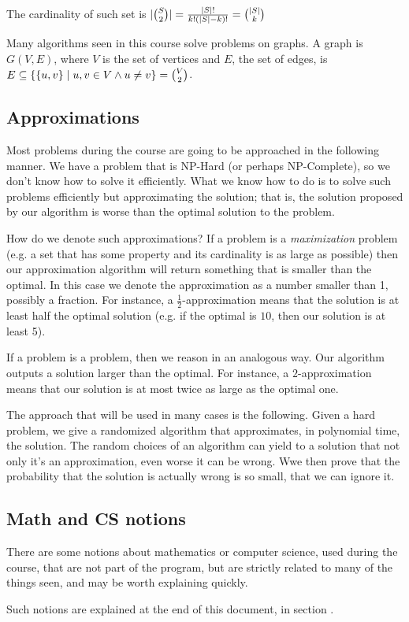     The cardinality of such set is $\vert \binom{S}{2} \vert = \frac{\vert S \vert!}{k! (\vert S \vert - k)!} = \binom{\vert S \vert}{k}$


    Many algorithms seen in this course solve problems on graphs.
    A graph is $G(V,E)$, where $V$ is the set of vertices and $E$, the set of edges, is $E \subseteq \{ \{ u,v \} \; \vert \; u,v \in V \wedge u \neq v \} = \binom{V}{2} $.


\subsection{Approximations}
    Most problems during the course are going to be approached in the following manner.
    We have a problem that is NP-Hard (or perhaps NP-Complete), so we don't know how to solve it efficiently.
    What we know how to do is to solve such problems efficiently but approximating the solution; that is, the solution proposed by our algorithm is worse than the optimal solution to the problem.

    How do we denote such approximations?
    If a problem is a \textit{maximization} problem (e.g. a set that has some property and its cardinality is as large as possible) then our approximation algorithm will return something that is smaller than the optimal.
    In this case we denote the approximation as a number smaller than 1, possibly a fraction. For instance, a $\frac{1}{2}$-approximation means that the solution is at least half the optimal solution (e.g. if the optimal is $10$, then our solution is at least 5).

    If a problem is a  problem, then we reason in an analogous way. Our algorithm outputs a solution larger than the optimal.
    For instance, a $2$-approximation means that our solution is at most twice as large as the optimal one.

    The approach that will be used in many cases is the following. Given a hard problem, we give a randomized algorithm that approximates, in polynomial time, the solution.
    The random choices of an algorithm can yield to a solution that not only it's an approximation, even worse it can be wrong.
    Wwe then prove that the probability that the solution is actually wrong is so small, that we can ignore it.

    \begin{center}
    \end{center}


\subsection{Math and CS notions}
    There are some notions about mathematics or computer science, used during the course, that are not part of the program, but are strictly related to many of the things seen, and may be worth explaining quickly.
    
    Such notions are explained at the end of this document, in section .